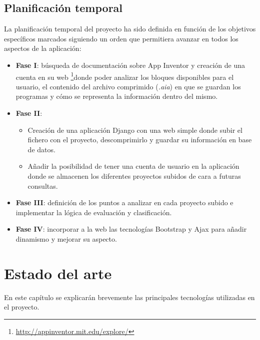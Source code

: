 \documentclass[a4paper, 12pt]{book}
\begin{document}
\section{Planificación temporal}
\label{sec:planificacion-temporal}
La planificación temporal del proyecto ha sido definida en función de los objetivos específicos marcados siguiendo un orden que permitiera avanzar en todos los aspectos de la aplicación:
\begin{itemize}
  \item \textbf{Fase I}: búsqueda de documentación sobre App Inventor y creación de una cuenta en su web \footnote{\url{http://appinventor.mit.edu/explore/}}donde poder analizar los bloques disponibles para el usuario, el contenido del archivo comprimido (\textit{.aia}) en que se guardan los programas y cómo se representa la información dentro del mismo. 

  \item \textbf{Fase II}: 
	\begin{itemize}
		\item Creación de una aplicación Django con una web simple donde subir el fichero con el proyecto, descomprimirlo y guardar su información en base de datos.
		\item Añadir la posibilidad de tener una cuenta de usuario en la aplicación donde se almacenen los diferentes proyectos subidos de cara a futuras consultas. 
	\end{itemize}
  \item \textbf{Fase III}: definición de los puntos a analizar en cada proyecto subido e implementar la lógica de evaluación y clasificación.
  
  
  \item \textbf{Fase IV}: incorporar a la web las tecnologías Bootstrap y Ajax para añadir dinamismo y mejorar su aspecto. 
\end{itemize}



\cleardoublepage
\chapter{Estado del arte}
En este capítulo se explicarán brevemente las principales tecnologías utilizadas en el proyecto.
\end{document}

